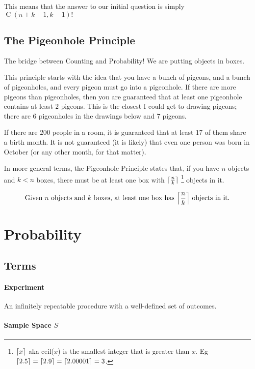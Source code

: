 \documentclass{report}
\DeclarePairedDelimiter{\ceil}{\lceil}{\rceil}
\DeclareMathOperator{\comb}{C}
\begin{document}
This means that the answer to our initial question is simply
$\comb(n + k + 1, k - 1)!$

\section{The Pigeonhole Principle}

The bridge between Counting and Probability!
We are putting objects in boxes. 

This principle starts with the idea that you have a bunch of pigeons, and a bunch of pigeonholes, and every pigeon must go into a pigeonhole. If there are more pigeons than pigeonholes, then you are guaranteed  that at least one pigeonhole contains at least 2 pigeons. This is the closest I could get to drawing pigeons; there are 6 pigeonholes in the drawings below and 7 pigeons. 

If there are 200 people in a room, it is guaranteed that at least 17 of them share a birth month. It is not guaranteed (it is likely) that even one person was born in October (or any other month, for that matter). 

In more general terms, the Pigeonhole Principle states that, if you have $n$ objects and $k < n$ boxes, there must be at least one box with $\ceil{\frac{n}{k}}$ \footnote{$\ceil{x}$ aka ceil($x$) is the smallest integer that is greater than $x$. Eg $\ceil{2.5} = \ceil{2.9} = \ceil{2.00001} = 3$.} objects in it.

\begin{equation}
    \text{Given $n$ objects and $k$ boxes, at least one box has } \ceil*{\frac{n}{k}} \text{ objects in it.}
\end{equation}


\chapter{Probability}

\section{Terms}

\subsubsection{Experiment}

An infinitely repeatable procedure with a well-defined set of outcomes.

\subsubsection{Sample Space $S$}
\end{document}
